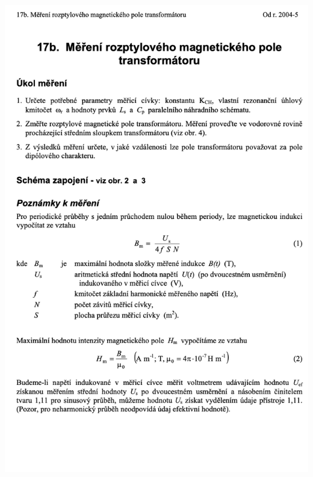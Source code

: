 \documentclass[a4paper,12pt]{article}   %
\begin{document}
\includegraphics[width=\textwidth]{2.png}
\newpage
\end{document}
